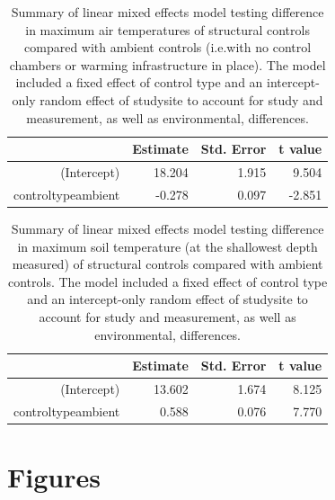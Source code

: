\documentclass{article}
\begin{document}
\begin{table}[ht]
\centering
\begin{tabular}{rrrr}
  \hline
 & Estimate & Std. Error & t value \\ 
  \hline
(Intercept) & 18.204 & 1.915 & 9.504 \\ 
  controltypeambient & -0.278 & 0.097 & -2.851 \\ 
   \hline
\end{tabular}
\caption{Summary of linear mixed effects model testing difference in maximum air temperatures of structural controls compared with ambient controls (i.e.with no control chambers or warming infrastructure in place). The model included a fixed effect of control type and an intercept-only random effect of studysite to account for study and measurement, as well as environmental, differences.} 
\end{table}
\begin{table}[ht]
\centering
\begin{tabular}{rrrr}
  \hline
 & Estimate & Std. Error & t value \\ 
  \hline
(Intercept) & 13.602 & 1.674 & 8.125 \\ 
  controltypeambient & 0.588 & 0.076 & 7.770 \\ 
   \hline
\end{tabular}
\caption{Summary of linear mixed effects model testing difference in maximum soil temperature (at the shallowest depth measured) of structural controls compared with ambient controls. The model included a fixed effect of control type and an intercept-only random effect of studysite to account for study and measurement, as well as environmental, differences.} 
\end{table}

\clearpage
\section* {Figures}
\end{document}
